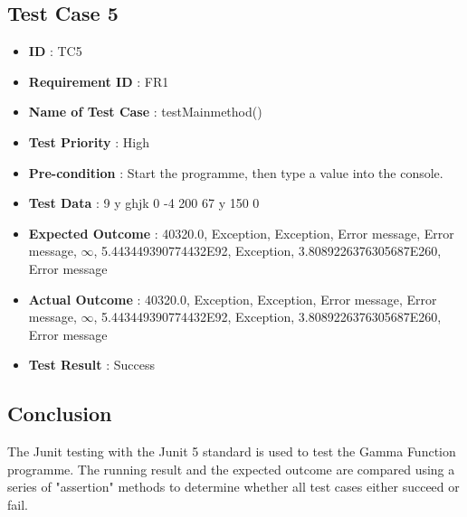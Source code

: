\documentclass[a4paper, 11pt]{article}
\begin{document}
\subsection{Test Case 5}
\begin{itemize}
    \item \textbf{ID} : TC5
    \item \textbf{Requirement ID} : FR1
    \item \textbf{Name of Test Case} : testMainmethod()
    \item \textbf{Test Priority} : High
    \item \textbf{Pre-condition} : Start the programme, then type a value into the console.
    \item \textbf{Test Data} : 9 y ghjk 0 -4 200 67 y 150 0
    \item \textbf{Expected Outcome} : 40320.0, Exception, Exception, Error message, Error message, $\infty$, 5.443449390774432E92, Exception, 3.8089226376305687E260, Error message
    \item \textbf{Actual Outcome} : 40320.0, Exception, Exception, Error message, Error message, $\infty$, 5.443449390774432E92, Exception, 3.8089226376305687E260, Error message
    \item \textbf{Test Result} : Success
\end{itemize}


\subsection{Conclusion}
The Junit testing with the Junit 5 standard is used to test the Gamma Function programme. The running result and the expected outcome are compared using a series of "assertion" methods to determine whether all test cases either succeed or fail.
\end{document}
